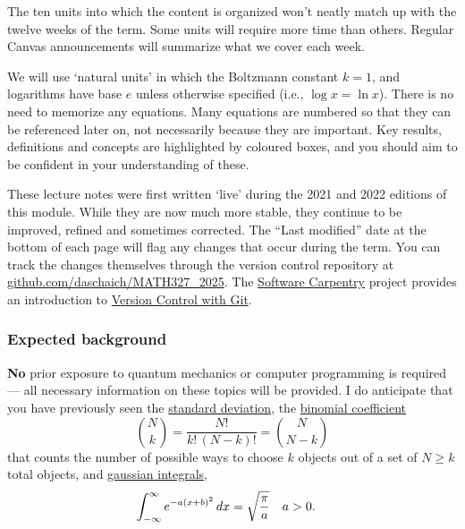 The ten units into which the content is organized won't neatly match up with the twelve weeks of the term.
Some units will require more time than others.
Regular Canvas announcements will summarize what we cover each week.

We will use `natural units' in which the Boltzmann constant $k = 1$, and logarithms have base $e$ unless otherwise specified (i.e., $\log x = \ln x$).
There is no need to memorize any equations.
Many equations are numbered so that they can be referenced later on, not necessarily because they are important.
Key results, definitions and concepts are highlighted by coloured boxes, and you should aim to be confident in your understanding of these.

These lecture notes were first written `live' during the 2021 and 2022 editions of this module.
While they are now much more stable, they continue to be improved, refined and sometimes corrected.
The ``Last modified'' date at the bottom of each page will flag any changes that occur during the term.
You can track the changes themselves through the version control repository at \href{https://github.com/daschaich/MATH327_2025}{github.com/daschaich/MATH327\_2025}.
The \href{https://software-carpentry.org}{Software Carpentry} project provides an introduction to \href{https://swcarpentry.github.io/git-novice/}{Version Control with Git}.

\subsubsection*{Expected background}
\textbf{No} prior exposure to quantum mechanics or computer programming is required --- all necessary information on these topics will be provided.
I do anticipate that you have previously seen the \href{https://en.wikipedia.org/wiki/Standard_deviation}{standard deviation}, the \href{https://en.wikipedia.org/wiki/Binomial_coefficient}{binomial coefficient}
\begin{equation*}
  \binom{N}{k} = \frac{N!}{k! \, (N - k)!} = \binom{N}{N - k}
\end{equation*}
that counts the number of possible ways to choose $k$ objects out of a set of $N \geq k$ total objects, and \href{https://en.wikipedia.org/wiki/Gaussian_integral}{gaussian integrals},
\begin{align*}
  \int_{-\infty}^{\infty} e^{-a (x + b)^2} \mathop{dx} & = \sqrt{\frac{\pi}{a}} &
  a & > 0.
\end{align*}

